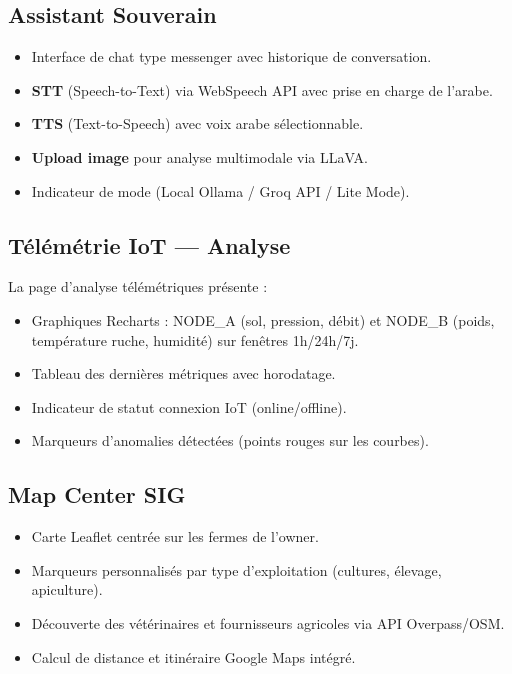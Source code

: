 \subsection{Assistant Souverain}

\begin{itemize}
  \item Interface de chat type messenger avec historique de conversation.
  \item \textbf{STT} (Speech-to-Text) via WebSpeech API avec prise en charge de l'arabe.
  \item \textbf{TTS} (Text-to-Speech) avec voix arabe sélectionnable.
  \item \textbf{Upload image} pour analyse multimodale via LLaVA.
  \item Indicateur de mode (Local Ollama / Groq API / Lite Mode).
\end{itemize}

\subsection{Télémétrie IoT — Analyse}

La page d'analyse télémétriques présente :
\begin{itemize}
  \item Graphiques Recharts  : NODE\_A (sol, pression, débit) et
        NODE\_B (poids, température ruche, humidité) sur fenêtres 1h/24h/7j.
  \item Tableau des dernières métriques avec horodatage.
  \item Indicateur de statut connexion IoT (online/offline).
  \item Marqueurs d'anomalies détectées (points rouges sur les courbes).
\end{itemize}

\subsection{Map Center SIG}

\begin{itemize}
  \item Carte Leaflet centrée sur les fermes de l'owner.
  \item Marqueurs personnalisés par type d'exploitation (cultures, élevage, apiculture).
  \item Découverte des vétérinaires et fournisseurs agricoles via API Overpass/OSM.
  \item Calcul de distance et itinéraire Google Maps intégré.
\end{itemize}

